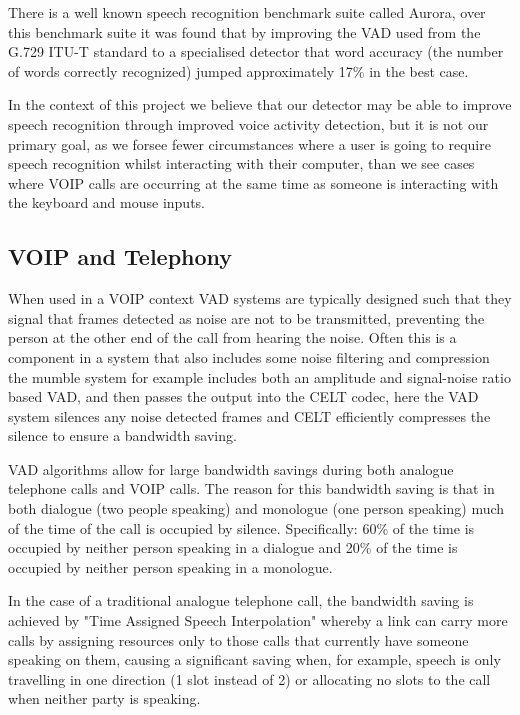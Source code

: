 \documentclass[ %
                    author={Sam Phippen},
                supervisor={Dr. Rafal Bogacz},
                     title={Real time voice activity detectors in noisy personal computing environments},
                  subtitle={},
                    degree={MEng},
                      year={2012} ]{thesis}
\begin{document}
There is a well known speech recognition benchmark suite called
Aurora\cite{aurora}, over this benchmark suite it was found\cite{ramirez-2}
that by improving the VAD used from the G.729 ITU-T\cite{itut} standard to a
specialised detector that word accuracy (the number of words correctly
recognized) jumped approximately 17\% in the best case.

In the context of this project we believe that our detector may be able to
improve speech recognition through improved voice activity detection, but it is
not our primary goal, as we forsee fewer circumstances where a user is going to
require speech recognition whilst interacting with their computer, than we see
cases where VOIP calls are occurring at the same time as someone is interacting
with the keyboard and mouse inputs.

\clearpage
\subsection{VOIP and Telephony}

When used in a VOIP context VAD systems are typically designed such that they
signal that frames detected as noise are not to be transmitted, preventing the
person at the other end of the call from hearing the noise. Often this is a
component in a system that also includes some noise filtering and compression
the mumble\cite{mumble} system for example includes both an amplitude and
signal-noise ratio based VAD, and then passes the output into the
CELT\cite{celt} codec, here the VAD system silences any noise detected frames
and CELT efficiently compresses the silence to ensure a bandwidth saving.

VAD algorithms allow for large bandwidth savings during both analogue
telephone calls and VOIP calls. The reason for this bandwidth saving is that in
both dialogue (two people speaking) and monologue (one person speaking) much of
the time of the call is occupied by silence. Specifically: 60\% of the time is
occupied by neither person speaking\cite{shah} in a dialogue and 20\% of the
time is occupied by neither person speaking in a monologue.

In the case of a traditional analogue telephone call, the bandwidth saving is
achieved by "Time Assigned Speech Interpolation" whereby a link can carry more
calls by assigning resources only to those calls that currently have someone
speaking on them, causing a significant saving when, for example, speech is
only travelling in one direction (1 slot instead of 2) or allocating no slots
to the call when neither party is speaking\cite{5016247}.
\end{document}
